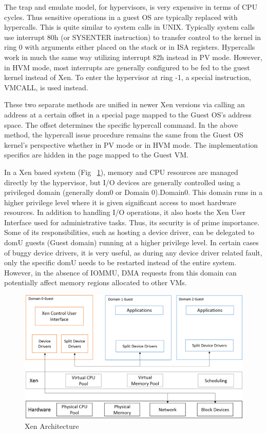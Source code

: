 

The trap and emulate model, for hypervisors, is very expensive in terms of CPU cycles. Thus sensitive operations in a guest OS are typically replaced with hypercalls. This is quite similar to system calls in UNIX. Typically system calls use interrupt 80h (or SYSENTER instruction) to transfer control to the kernel in ring 0 with arguments either placed on the stack or in ISA registers. Hypercalls work in much the same way utilizing interrupt 82h instead in PV mode. However, in HVM mode, most interrupts are generally configured to be fed to the guest kernel instead of Xen. To enter the hypervisor at ring -1, a special instruction, VMCALL, is used instead. 

 

These two separate methods are unified in newer Xen versions via calling an address at a certain offset in a special page mapped to the Guest OS's address space. The offset determines the specific hypercall command. In the above method, the hypercall issue procedure remains the same from the Guest OS kernel's perspective whether in PV mode or in HVM mode. The implementation specifics are hidden in the page mapped to the Guest VM. 

 
In a Xen based system (Fig ~\ref{fig:xen_model}), memory and CPU resources are managed directly by the hypervisor, but I/O devices are generally controlled using a privileged domain (generally dom0 or Domain 0).Domain0. This domain runs in a higher privilege level where it is given significant access to most hardware resources. In addition to handling I/O operations, it also hosts the Xen User Interface used for administrative tasks. Thus, its security is of prime importance. Some of its responsibilities, such as hosting a device driver, can be delegated to domU guests (Guest domain) running at a higher privilege level. In certain cases of buggy device drivers, it is very useful, as during any device driver related fault, only the specific domU needs to be restarted instead of the entire system. However, in the absence of IOMMU, DMA requests from this domain can potentially affect memory regions allocated to other VMs. 

\begin{figure}[H]
\centering
\includegraphics[scale=0.6]{figures/Xen_model.png}
\caption{Xen Architecture}
\label{fig:xen_model}
\end{figure}

